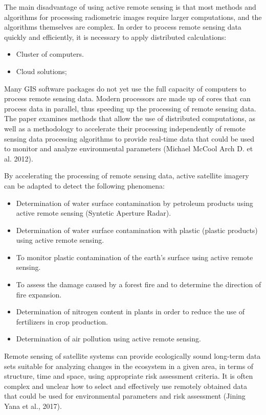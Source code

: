 {{	The main disadvantage of using active remote sensing is that most methods and algorithms for processing radiometric images require larger computations, and the algorithms themselves are complex.
	In order to process remote sensing data quickly and efficiently, it is necessary to apply distributed calculations:
	
	\begin{itemize}
		\item Cluster of computers.
		\item Cloud solutions;
	\end{itemize}
	
	Many GIS software packages do not yet use the full capacity of computers to process remote sensing data. Modern processors are made up of cores that can process data in parallel, thus speeding up the processing of remote sensing data. The paper examines methods that allow the use of distributed computations, as well as a methodology to accelerate their processing independently of remote sensing data processing algorithms to provide real-time data that could be used to monitor and analyze environmental parameters (Michael McCool Arch D. et al. 2012).
	
	By accelerating the processing of remote sensing data, active satellite imagery can be adapted to detect the following phenomena:
	
	\begin{itemize}
		\item Determination of water surface contamination by petroleum products using active remote sensing (Syntetic Aperture Radar).
		\item Determination of water surface contamination with plastic (plastic products) using active remote sensing.
		\item To monitor plastic contamination of the earth's surface using active remote sensing.
		\item To assess the damage caused by a forest fire and to determine the direction of fire expansion.
		\item Determination of nitrogen content in plants in order to reduce the use of fertilizers in crop production.
		\item Determination of air pollution using active remote sensing.
	\end{itemize}
	
	Remote sensing of satellite systems can provide ecologically sound long-term data sets suitable for analyzing changes in the ecosystem in a given area, in terms of structure, time and space, using appropriate risk assessment criteria. It is often complex and unclear how to select and effectively use remotely obtained data that could be used for environmental parameters and risk assessment (Jining Yana et al., 2017).
	
}}
